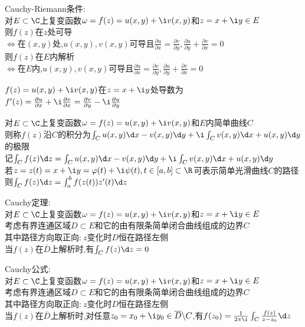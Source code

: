 \begin{dingli}
Cauchy-Riemann条件:\\
对$E\subset \C$上复变函数$\omega=f(z)=u(x,y)+\i v(x,y)$和$z=x+\i y\in E$\\
则$f(z)$在$z$处可导\\
$\Leftrightarrow$在$(x,y)$处,$u(x,y),v(x,y)$可导且$\frac{\partial u}{\partial x}=\frac{\partial v}{\partial y},\frac{\partial u}{\partial y}+\frac{\partial v}{\partial x}=0$\\
则$f(z)$在$E$内解析\\
$\Leftrightarrow$在$E$内,$u(x,y),v(x,y)$可导且$\frac{\partial u}{\partial x}=\frac{\partial v}{\partial y},\frac{\partial u}{\partial y}+\frac{\partial v}{\partial x}=0$
\end{dingli}

\begin{tuilun}
$f(z)=u(x,y)+\i v(x,y)$在$z=x+\i y$处导数为\\
$f'(z)=\frac{\partial u}{\partial x}+\i\frac{\partial v}{\partial x}=\frac{\partial v}{\partial y}-\i\frac{\partial u}{\partial y}$
\end{tuilun}

\begin{dingyi}
对$E\subset \C$上复变函数$\omega=f(z)=u(x,y)+\i v(x,y)$和$E$内简单曲线$C$\\
则称$f(z)$沿$C$的积分为$\int_{C}u(x,y)\d x-v(x,y)\d y+\i\int_{C}v(x,y)\d x+u(x,y)\d y$的极限\\
记$\int_{C}f(z)\d z=\int_{C}u(x,y)\d x-v(x,y)\d y+\i\int_{C}v(x,y)\d x+u(x,y)\d y$\\
若$z=z(t)=x+\i y=\varphi(t)+\i \psi(t),t\in [a,b]\subset \R$可表示简单光滑曲线$C$的路径\\
则$\int_{C}f(z)\d z=\int_{a}^{b}f(z(t))z'(t)\d z$
\end{dingyi}

\begin{dingli}
Cauchy定理:\\
对$E\subset \C$上复变函数$\omega=f(z)=u(x,y)+\i v(x,y)$和$z=x+\i y\in E$\\
考虑有界连通区域$D\subset E$和它的由有限条简单闭合曲线组成的边界$C$\\
其中路径方向取正向:$\ z$变化时$D$恒在路径左侧\\
当$f(z)$在$\overline{D}$上解析时,有$\int_{C}f(z)\d z=0$
\end{dingli}

\begin{dingli}
Cauchy公式:\\
对$E\subset \C$上复变函数$\omega=f(z)=u(x,y)+\i v(x,y)$和$z=x+\i y\in E$\\
考虑有界连通区域$D\subset E$和它的由有限条简单闭合曲线组成的边界$C$\\
其中路径方向取正向:$\ z$变化时$D$恒在路径左侧\\
当$f(z)$在$\overline{D}$上解析时,对任意$z_0=x_0+\i y_0\in \overline{D}\backslash C$,有$f(z_0)=\frac{1}{2\pi\i}\int_{C}\frac{f(z)}{z-z_0}\d z$
\end{dingli}

